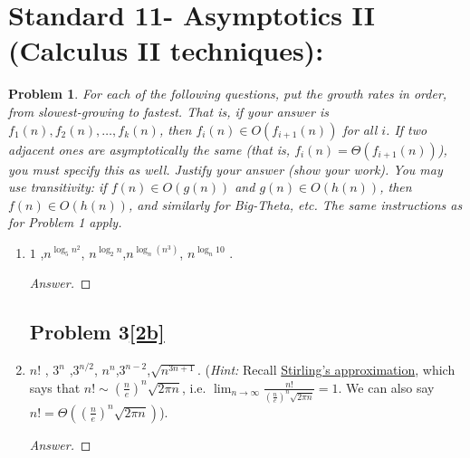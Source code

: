 \documentclass[11pt]{article}
\theoremstyle{definition}
\theoremstyle{definition}
\newtheorem{required}{Problem}
\theoremstyle{definition}
\begin{document}
\section{Standard 11- Asymptotics II (Calculus II techniques): }
\begin{required}



    {\itshape For each of the following questions, put the growth rates in order, from slowest-growing to fastest. That is, if your answer is $f_1(n), f_2(n), \dotsc, f_k(n)$, then $f_i(n) \in O(f_{i+1}(n))$ for all $i$. If two adjacent ones are asymptotically the same (that is, $f_i(n) = \Theta(f_{i+1}(n))$), you must specify this as well. 
    Justify your answer (show your work). You may use transitivity: if $f(n) \in O(g(n))$ and $g(n) \in O(h(n))$, then $f(n) \in O(h(n))$, and similarly for Big-Theta, etc. The same instructions as for Problem 1 apply.}
    \begin{enumerate}[label=(\alph*)]
\subsection{Problem 3\ref{2a}}
        \item \label{2a} $1$ ,\qquad $n^{\log_5 n^2}$, \qquad $n^{\log_2 n}$,\qquad  $n^{\log_n(n^3)}$, \qquad $ n^{\log_n 10}$ .
        \begin{proof}[Answer]

        \end{proof}
        \newpage

\subsection{Problem 3\ref{2b}}
        \item \label{2b} $n!$ , \qquad $3^n$ ,\qquad  $3^{n/2}$, \qquad  $n^n$,\qquad $3^{n-2}$,\qquad  $\sqrt{n^{3n+1}}$. (\emph{Hint:} Recall \href{https://en.wikipedia.org/wiki/Stirling\%27s_approximation}{Stirling's approximation}, which says that $n! \sim \left(\frac{n}{e}\right)^n \sqrt{2 \pi n}$, i.e. $\lim_{n \to \infty} \frac{n!}{\left(\frac{n}{e}\right)^n \sqrt{2 \pi n}} = 1$. We can also say $n! = \Theta (\left(\frac{n}{e}\right)^n \sqrt{2 \pi n} )$).
        \begin{proof}[Answer]

        \end{proof}
\end{enumerate}

\end{required}
\end{document}
